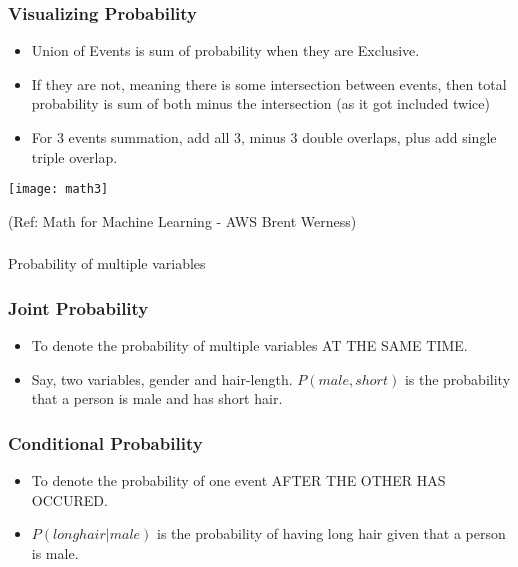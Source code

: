\begin{frame}
\frametitle{Visualizing Probability}
\begin{itemize}
\item  Union of Events is sum of probability when they are Exclusive.
\item If they are not, meaning there is some intersection between events, then total probability is sum of both minus the intersection (as it got included twice)
\item For 3 events summation, add all 3, minus 3 double overlaps, plus add single triple overlap.
\end{itemize}

\begin{center}
\texttt{[image: math3]}
\end{center}

\tiny{(Ref: Math for Machine Learning - AWS Brent Werness)}
\end{frame}



\begin{frame}[fragile]\frametitle{}
\begin{center}
{\Large Probability of multiple variables}
\end{center}
\end{frame}

\begin{frame}
\frametitle{Joint Probability}
\begin{itemize}
\item  To denote the probability of multiple variables AT THE SAME TIME.
\item Say, two variables, gender and hair-length.  $P(male, short)$ is the probability that a person is male and has short hair.
\end{itemize}
\end{frame}

\begin{frame}
\frametitle{Conditional Probability}
\begin{itemize}
\item  To denote the probability of one event AFTER THE OTHER HAS OCCURED.
\item  $P (long hair | male)$ is the probability of having long hair given that a person is male.
\end{itemize}
\end{frame}

